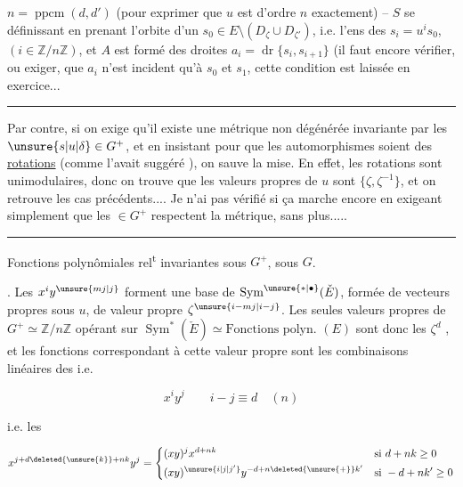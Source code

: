 
$n=\operatorname{ppcm}(d,d')$ (pour exprimer que $u$ est d'ordre $n$ exactement) -- $S$ se définissant en prenant l'orbite d'un $s_0\in E\setminus(D_\zeta\cup D_{\zeta'})$,  i.e. l'ens des $s_i=u^i s_0$,  $(i\in\mathbb Z/n\mathbb Z)$, et $A$ est formé des droites $a_i=\operatorname{dr}\{s_i,s_{i+1}\}$ (il faut encore vérifier, ou exiger, que $a_i$ n'est incident qu'à $s_0$ et $s_1$, cette condition est laissée en exercice...

\rule{1.7cm}{.35pt}

Par contre, si on exige  qu'il existe une métrique non dégénérée invariante par les $\unsure{s|u|\delta}\in G^+$, et en insistant pour que les automorphismes soient des \uline{rotations} (comme l'avait suggéré ), on sauve la mise. En effet, les rotations sont unimodulaires, donc on trouve que les valeurs propres de $u$ sont $\{\zeta,\zeta^{-1}\}$, et on retrouve les cas précédents.... Je n'ai pas vérifié si ça marche encore en exigeant simplement que les $\in G^+$ respectent la métrique, sans plus.....

\rule{2.2cm}{.35pt}


Fonctions polynômiales rel\textsuperscript{t} invariantes sous $G^+$, sous $G$.

. Les $x^{i}y^{\unsure{mj|j}}$ forment une base de $\operatorname{Sym}^{\unsure{*|\bullet}}(\check E)$, formée de vecteurs propres sous $u$, de valeur propre $\zeta^{\unsure{i-mj|i-j}}$.  Les seules valeurs propres de $G^+\simeq\mathbb Z/n\mathbb Z$ opérant sur $\operatorname{Sym}^*(\check E)\simeq\text{Fonctions polyn. }(E)$ sont donc les $\zeta^d$ , et les fonctions correspondant à cette valeur propre sont les combinaisons linéaires des  i.e.

\[x^iy^j\qquad i-j\equiv d\quad(n)\]

i.e. les

\[
x^{j+d\deleted{\unsure{k}}+nk}y^j=
\left\{\begin{aligned}
&(xy)^j x^{d+nk}&&\text{si }d+nk\geq0\\
&(xy)^{\unsure{i|j|j'}}y^{-d+n\deleted{\unsure{+}}k'}&&\text{si }-d+nk'\geq0
\end{aligned}\right.
\]

